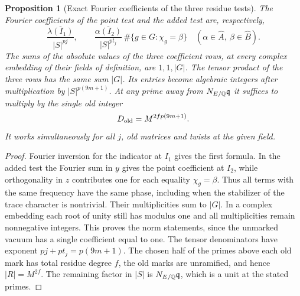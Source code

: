 \documentclass[a4paper,11pt]{article}
\newtheorem{proposition}{Proposition}[section]
\theoremstyle{definition}
\theoremstyle{remark}
\numberwithin{equation}{section}
\begin{document}
\begin{proposition}[Exact Fourier coefficients of the three residue tests]
\leavevmode\label{prop:markedfourier820}
The Fourier coefficients of the point test and the added test are,
respectively,
\[
   \frac{\overline{\lambda(I_1)}}{|S|^{pj}},\qquad
   \frac{\overline{\alpha(I_2)}}{|S|^{pt_j}}\,
        \#\{g\in G:\chi_g=\beta\}
      \quad(\alpha\in\widehat A,\ \beta\in\widehat B).
\]
The sums of the absolute values of the three coefficient rows,
at every complex embedding of their fields of definition, are
\(1,1,|G|\). The tensor product of the three rows has the same
sum \(|G|\). Its entries become algebraic integers after
multiplication by \(|S|^{p(9m+1)}\). At any prime away from
\(N_{E/\mathbb Q}\mathfrak q\) it suffices to multiply by the single
old integer
\[
       D_{\rm old}=M^{2fp(9m+1)}.
\]
It works simultaneously for all \(j\), old matrices and twists
at the given field.
\end{proposition}
\begin{proof}
Fourier inversion for the indicator at \(I_1\) gives the first
formula. In the added test the Fourier sum in \(y\) gives the
point coefficient at \(I_2\), while orthogonality in \(z\)
contributes one for each equality \(\chi_g=\beta\). Thus all
terms with the same frequency have the same phase, including
when the stabilizer of the trace character is nontrivial.
Their multiplicities sum to \(|G|\). In a complex embedding
each root of unity still has modulus one and all multiplicities
remain nonnegative integers. This proves the norm statements,
since the unmarked vacuum has a single coefficient equal to one.
The tensor denominators have exponent \(pj+pt_j=p(9m+1)\).
The chosen half of the primes above each old mark has total
residue degree \(f\), the old marks are unramified, and hence
\(|R|=M^{2f}\). The remaining factor in \(|S|\) is
\(N_{E/\mathbb Q}\mathfrak q\), which is a unit at the stated primes.
\end{proof}
\end{document}
